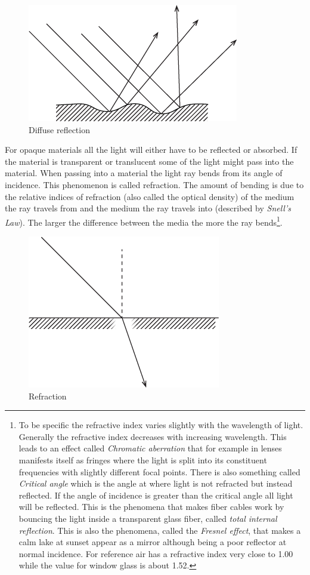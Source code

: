 \documentclass{article}
\begin{document}
\begin{figure}[ht!]
\centering
\includegraphics{images/diffuse-reflection.png}
\caption{Diffuse reflection}
\end{figure}


For opaque materials all the light will either have to be reflected or
absorbed. If the material is transparent or translucent some of the
light might pass into the material. When passing into a material the
light ray bends from its angle of incidence. This phenomenon is called
refraction. The amount of bending is due to the relative indices of
refraction (also called the optical density) of the medium the ray
travels from and the medium the ray travels into (described by
\emph{Snell's Law}). The larger the difference between the media the
more the ray bends\footnote{To be specific the refractive index varies
  slightly with the wavelength of light. Generally the refractive index
  decreases with increasing wavelength. This leads to an effect called
  \emph{Chromatic aberration} that for example in lenses manifests
  itself as fringes where the light is split into its constituent
  frequencies with slightly different focal points. There is also
  something called \emph{Critical angle} which is the angle at where
  light is not refracted but instead reflected. If the angle of
  incidence is greater than the critical angle all light will be
  reflected. This is the phenomena that makes fiber cables work by
  bouncing the light inside a transparent glass fiber, called
  \emph{total internal reflection}. This is also the phenomena, called
  the \emph{Fresnel effect}, that makes a calm lake at sunset appear as
  a mirror although being a poor reflector at normal incidence. For
  reference air has a refractive index very close to 1.00 while the
  value for window glass is about 1.52.}.

\begin{figure}[ht!]
\centering
\includegraphics{images/refraction.png}
\caption{Refraction}
\end{figure}
\end{document}
